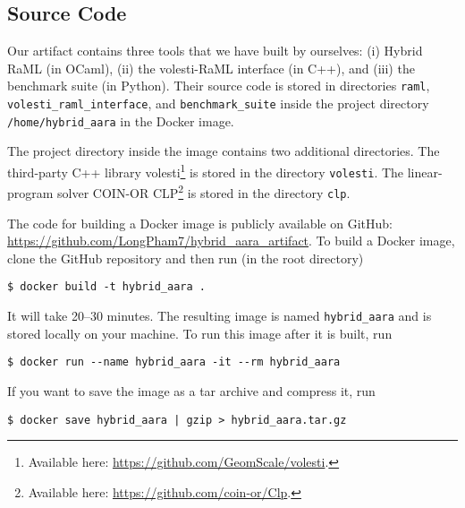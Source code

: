 \subsection{Source Code}

Our artifact contains three tools that we have built by ourselves: (i) Hybrid
RaML (in OCaml), (ii) the volesti-RaML interface (in C++), and (iii) the
benchmark suite (in Python).
%
Their source code is stored in directories \texttt{raml},
\texttt{volesti\_raml\_interface}, and \texttt{benchmark\_suite} inside the
project directory \texttt{/home/hybrid\_aara} in the Docker image.

The project directory inside the image contains two additional directories.
%
The third-party C++ library volesti\footnote{Available here:
\url{https://github.com/GeomScale/volesti}.} is stored in the directory
\texttt{volesti}.
%
The linear-program solver COIN-OR CLP\footnote{Available here:
\url{https://github.com/coin-or/Clp}.} is stored in the directory \texttt{clp}.

The code for building a Docker image is publicly available on GitHub:
\url{https://github.com/LongPham7/hybrid_aara_artifact}.
%
To build a Docker image, clone the GitHub repository and then run (in the root
directory)
\begin{verbatim}
$ docker build -t hybrid_aara .
\end{verbatim}
%
It will take 20--30 minutes.
%
The resulting image is named \texttt{hybrid\_aara} and is stored locally on your
machine.
%
To run this image after it is built, run
\begin{verbatim}
$ docker run --name hybrid_aara -it --rm hybrid_aara
\end{verbatim}
%
If you want to save the image as a tar archive and compress it, run
\begin{verbatim}
$ docker save hybrid_aara | gzip > hybrid_aara.tar.gz
\end{verbatim}
